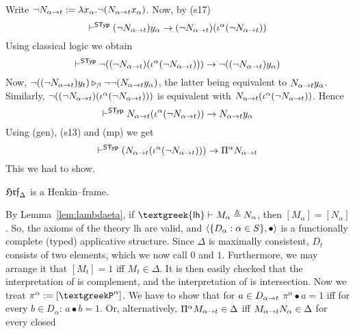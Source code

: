 \proofbeg
Write $\nicht N_{\alpha\pf t} := \lambda x_{\alpha}.\nicht %
(N_{\alpha\pf t}x_{\alpha})$. Now, by (s17)
\begin{equation}
\vdash^{\mathsf{STyp}} (\nicht N_{\alpha\pf
t})y_{\alpha} \pf (\nicht N_{\alpha\pf t})(\iota^{\alpha}(\nicht %
N_{\alpha \pf t}))
\end{equation}
Using classical logic we obtain
\begin{equation}
\vdash^{\mathsf{STyp}} \nicht ((\nicht N_{\alpha\pf t})(\iota^{\alpha} %
(\nicht N_{\alpha\pf t}))) \pf \nicht ((\nicht N_{\alpha\pf
t})y_{\alpha})
\end{equation}
Now, $\neg ((\neg N_{\alpha\rightarrow t})y_t) \triangleright_{\beta}
\neg \neg (N_{\alpha\rightarrow t}y_{\alpha})$, the latter being
equivalent to $N_{\alpha\rightarrow t}y_{\alpha}$. Similarly,
$\neg ((\neg N_{\alpha\rightarrow t})(\iota^{\alpha}(\neg N_{\alpha\rightarrow t})))$
is equivalent with $N_{\alpha\rightarrow t}(\iota^{\alpha}(\neg
N_{\alpha\rightarrow t}))$. Hence
\begin{equation}
\vdash^{\mathsf{STyp}} N_{\alpha\rightarrow t}(\iota^{\alpha}(\neg
N_{\alpha\rightarrow t})) \rightarrow N_{\alpha\rightarrow t}y_{\alpha} 
\end{equation}
Using (gen), (s13) and (mp) we get
\begin{equation}
\vdash^{\mathsf{STyp}} (N_{\alpha\rightarrow t}(\iota^{\alpha}(\neg
N_{\alpha\rightarrow t}))) \rightarrow \Pi^{\alpha}N_{\alpha\rightarrow t}
\end{equation}
This we had to show.
\proofend
\begin{lem}
$\mathfrak{Hrf}_{\Delta}$ is a Henkin--frame.
\end{lem}
\proofbeg%
By Lemma~\ref{lem:lambdaeta}, if $\mbox{\sf\textgreek{lh}} \vdash
M_{\alpha} \neweq N_{\alpha}$, then $[M_{\alpha}] = [N_{\alpha}]$.
So, the axioms of the theory {\sf\textgreek{lh}} are valid, and
$\langle \{D_{\alpha} : \alpha \in S\}, \bullet\rangle$ is a functionally
complete (typed) applicative structure. Since $\Delta$ is
maximally consistent, $D_t$ consists of two elements, which we now
call $0$ and $1$. Furthermore, we may arrange it that $[M_t] = 1$
iff $M_t \in \Delta$. It is then easily checked that
the interpretation of {\mtt{}} is complement, and the 
interpretation of {\mtt{}} is intersection. Now we treat 
$\pi^{\alpha} := [\GPi^{\alpha}]$. We have to
show that for $a \in D_{\alpha\rightarrow t}$
$\pi^{\alpha} \bullet a = 1$ iff
for every $b \in D_{\alpha}$: $a \bullet b = 1$. Or,
alternatively, $\Pi^{\alpha}M_{\alpha\rightarrow t} \in \Delta$ iff 
$M_{\alpha\rightarrow t}N_{\alpha} \in \Delta$ for every closed
